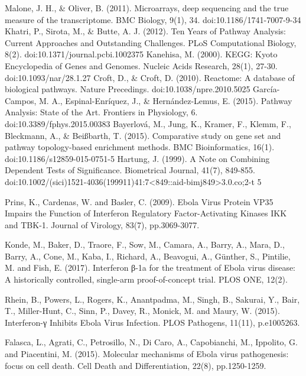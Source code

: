 \documentclass[twocolumn]{article}
\begin{document}
\begin{thebibliography}{9}
	 
	Malone, J. H., \& Oliver, B. (2011). Microarrays, deep sequencing and the true measure of the transcriptome. BMC Biology, 9(1), 34. doi:10.1186/1741-7007-9-34
	Khatri, P., Sirota, M., \& Butte, A. J. (2012). Ten Years of Pathway Analysis: Current Approaches and Outstanding Challenges. PLoS Computational Biology, 8(2). doi:10.1371/journal.pcbi.1002375
	Kanehisa, M. (2000). KEGG: Kyoto Encyclopedia of Genes and Genomes. Nucleic Acids Research, 28(1), 27-30. doi:10.1093/nar/28.1.27
	Croft, D., \& Croft, D. (2010). Reactome: A database of biological pathways. Nature Precedings. doi:10.1038/npre.2010.5025
	García-Campos, M. A., Espinal-Enríquez, J., \& Hernández-Lemus, E. (2015). Pathway Analysis: State of the Art. Frontiers in Physiology, 6. doi:10.3389/fphys.2015.00383 
	Bayerlová, M., Jung, K., Kramer, F., Klemm, F., Bleckmann, A., \& Beißbarth, T. (2015). Comparative study on gene set and pathway topology-based enrichment methods. BMC Bioinformatics, 16(1). doi:10.1186/s12859-015-0751-5   
	Hartung, J. (1999). A Note on Combining Dependent Tests of Significance. Biometrical Journal, 41(7), 849-855. doi:10.1002/(sici)1521-4036(199911)41:7<849::aid-bimj849>3.0.co;2-t 5 
	
	Prins, K., Cardenas, W. and Basler, C. (2009). Ebola Virus Protein VP35 Impairs the Function of Interferon Regulatory Factor-Activating Kinases IKK and TBK-1. Journal of Virology, 83(7), pp.3069-3077.
	
	Konde, M., Baker, D., Traore, F., Sow, M., Camara, A., Barry, A., Mara, D., Barry, A., Cone, M., Kaba, I., Richard, A., Beavogui, A., Günther, S., Pintilie, M. and Fish, E. (2017). Interferon β-1a for the treatment of Ebola virus disease: A historically controlled, single-arm proof-of-concept trial. PLOS ONE, 12(2).
	
	Rhein, B., Powers, L., Rogers, K., Anantpadma, M., Singh, B., Sakurai, Y., Bair, T., Miller-Hunt, C., Sinn, P., Davey, R., Monick, M. and Maury, W. (2015). Interferon-γ Inhibits Ebola Virus Infection. PLOS Pathogens, 11(11), p.e1005263.
	
	Falasca, L., Agrati, C., Petrosillo, N., Di Caro, A., Capobianchi, M., Ippolito, G. and Piacentini, M. (2015).
	 Molecular mechanisms of Ebola virus pathogenesis: focus on cell death. Cell Death and Differentiation, 22(8), pp.1250-1259.
	 

\end{thebibliography}
\end{document}
